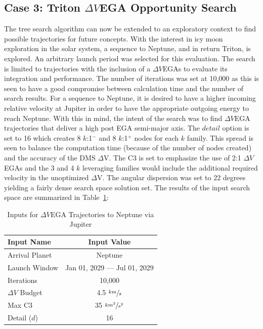 \documentclass[letterpaper, preprint, paper,11pt]{AAS}	%
\begin{document}
\subsection{Case 3: Triton $\Delta V$EGA Opportunity Search}
The tree search algorithm can now be extended to an exploratory context to find possible trajectories for future concepts. With the interest in icy moon exploration in the solar system, a sequence to Neptune, and in return Triton, is explored\cite{Hubbard2010}. An arbitrary launch period was selected for this evaluation. The search is limited to trajectories with the inclusion of a $\Delta V$EGAs to evaluate its integration and performance. The number of iterations was set at 10,000 as this is seen to have a good compromise between calculation time and the number of search results. For a sequence to Neptune, it is desired to have a higher incoming relative velocity at Jupiter in order to have the appropriate outgoing energy to reach Neptune. With this in mind, the intent of the search was to find $\Delta V$EGA trajectories that deliver a high post EGA semi-major axis. The $\textit{detail}$ option is set to 16 which creates 8 $k$:1$^{-}$ and 8 $k$:1$^{+}$ nodes for each $k$ family. This spread is seen to balance the computation time (because of the number of nodes created) and the accuracy of the  DMS $\Delta$V. The C3 is set to emphasize the use of 2:1 $\Delta V$EGAs and the 3 and 4 $k$ leveraging families  would include the additional required velocity in the unoptimized $\Delta$V. The angular dispersion was set to 22 degrees yielding a fairly dense search space solution set. The results of the input search space are summarized in Table~\ref{tab:tritonInputs}:
%
%
\begin{table}[h]
    \begin{center}
        \caption{Inputs for $\Delta V$EGA Trajectories to Neptune via Jupiter}
        \label{tab:tritonInputs}
        \begin{tabular}{lc}
            \toprule
            \textbf{Input Name} & \textbf{Input Value}\\
            \midrule
            Arrival Planet & Neptune \\
            Launch Window \quad \quad & Jan 01, 2029 --- Jul 01, 2029 \\
            Iterations & 10,000 \\
            $\Delta V$ Budget & 4.5 $\sfrac{km}{s}$ \\
            Max C3 & 35 $\sfrac{km^2}{s^2}$ \\
            Detail ($d$) & 16 \\
            \bottomrule
        \end{tabular}
    \end{center}
\end{table}
%
%
\end{document}
